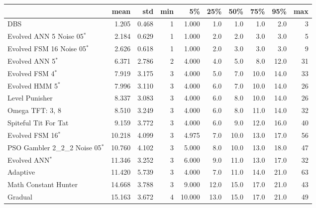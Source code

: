 \begin{tabular}{lrrrrrrrrr}
\toprule
{} &    mean &    std &  min &      5\% &   25\% &   50\% &   75\% &   95\% &  max \\
\midrule
DBS                              &   1.205 &  0.468 &    1 &   1.000 &   1.0 &   1.0 &   1.0 &   2.0 &    3 \\
Evolved ANN 5 Noise 05$^{*}$     &   2.184 &  0.629 &    1 &   1.000 &   2.0 &   2.0 &   3.0 &   3.0 &    5 \\
Evolved FSM 16 Noise 05$^{*}$    &   2.626 &  0.618 &    1 &   1.000 &   2.0 &   3.0 &   3.0 &   3.0 &    9 \\
Evolved ANN 5$^{*}$              &   6.371 &  2.786 &    2 &   4.000 &   4.0 &   5.0 &   8.0 &  12.0 &   31 \\
Evolved FSM 4$^{*}$              &   7.919 &  3.175 &    3 &   4.000 &   5.0 &   7.0 &  10.0 &  14.0 &   33 \\
Evolved HMM 5$^{*}$              &   7.996 &  3.110 &    3 &   4.000 &   6.0 &   7.0 &  10.0 &  14.0 &   26 \\
Level Punisher                   &   8.337 &  3.083 &    3 &   4.000 &   6.0 &   8.0 &  10.0 &  14.0 &   26 \\
Omega TFT: 3, 8                  &   8.510 &  3.249 &    3 &   4.000 &   6.0 &   8.0 &  11.0 &  14.0 &   32 \\
Spiteful Tit For Tat             &   9.159 &  3.772 &    3 &   4.000 &   6.0 &   9.0 &  12.0 &  16.0 &   40 \\
Evolved FSM 16$^{*}$             &  10.218 &  4.099 &    3 &   4.975 &   7.0 &  10.0 &  13.0 &  17.0 &   56 \\
PSO Gambler 2\_2\_2 Noise 05$^{*}$ &  10.760 &  4.102 &    3 &   5.000 &   8.0 &  10.0 &  13.0 &  18.0 &   47 \\
Evolved ANN$^{*}$                &  11.346 &  3.252 &    3 &   6.000 &   9.0 &  11.0 &  13.0 &  17.0 &   32 \\
Adaptive                         &  11.420 &  5.739 &    3 &   4.000 &   7.0 &  11.0 &  14.0 &  21.0 &   63 \\
Math Constant Hunter             &  14.668 &  3.788 &    3 &   9.000 &  12.0 &  15.0 &  17.0 &  21.0 &   43 \\
Gradual                          &  15.163 &  3.672 &    4 &  10.000 &  13.0 &  15.0 &  17.0 &  21.0 &   49 \\
\bottomrule
\end{tabular}
